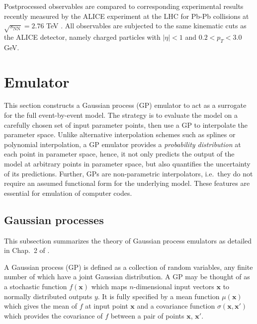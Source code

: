 \documentclass[aps,prc,reprint,superscriptaddress,amsmath]{revtex4-1}
\begin{document}
Postprocessed observables are compared to corresponding experimental results recently measured by the ALICE experiment at the LHC for Pb-Pb collisions at $\sqrt{s_\text{NN}} = 2.76$ TeV \cite{Abelev:2014mda}.
All observables are subjected to the same kinematic cuts as the ALICE detector, namely charged particles with $|\eta| < 1$ and $0.2 < p_T < 3.0$ GeV.


\section{Emulator}

This section constructs a Gaussian process (GP) emulator to act as a surrogate for the full event-by-event model.
The strategy is to evaluate the model on a carefully chosen set of input parameter points, then use a GP to interpolate the parameter space.
Unlike alternative interpolation schemes such as splines or polynomial interpolation, a GP emulator provides a \emph{probability distribution} at each point in parameter space, hence, it not only predicts the output of the model at arbitrary points in parameter space, but also quantifies the uncertainty of its predictions.
Further, GPs are non-parametric interpolators, i.e.\ they do not require an assumed functional form for the underlying model.
These features are essential for emulation of computer codes.

\subsection{Gaussian processes}

\newcommand{\x}{\mathbf x}
\newcommand{\y}{\mathbf y}
\newcommand{\zero}{\mathbf 0}
\newcommand{\muvec}{\boldsymbol\mu}
\newcommand{\N}{\mathcal N}

This subsection summarizes the theory of Gaussian process emulators as detailed in Chap.~2 of \cite{Rasmussen:2006gp}.

A Gaussian process (GP) is defined as a collection of random variables, any finite number of which have a joint Gaussian distribution.
A GP may be thought of as a stochastic function $f(\x)$ which maps $n$-dimensional input vectors $\x$ to normally distributed outputs $y$.
It is fully specified by a mean function $\mu(\x)$ which gives the mean of $f$ at input point $\x$ and a covariance function $\sigma(\x, \x')$ which provides the covariance of $f$ between a pair of points $\x$, $\x'$.
\end{document}
